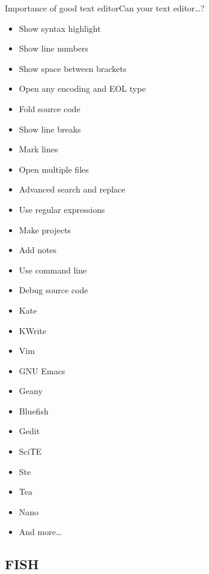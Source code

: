 \documentclass[hyperref={bookmarks=true, unicode=true, colorlinks=true, pdftitle={Linux, command line and MetaCentrum}, plainpages=false, pdfauthor={Vojtech Zeisek}, pdfsubject={Course about use of Linux command line, writing shell scripts and using MetaCentrum of CESNET}, pdfcreator={XeLaTeX, http://www.xelatex.org/}, pdfkeywords={Linux, GNU, BASH, shell, command line, MetaCentrum}, linkcolor=Sienna, anchorcolor=black, citecolor=green, filecolor=magenta, menucolor=Sienna, urlcolor=cyan, pdftex}, compress, ucs, xelatex, xcolor=svgnames, 11pt]{beamer}
\begin{document}
\begin{frame}[label=editors]{Importance of good text editor}{Can your text editor\ldots ?}
\begin{multicols}{2}
  \begin{itemize}
    \item Show syntax highlight
    \item Show line numbers
    \item Show space between brackets
    \item Open any encoding and EOL type
    \item Fold source code
    \item Show line breaks
    \item Mark lines
    \item Open multiple files
    \item Advanced search and replace
    \item Use regular expressions
    \item Make projects
    \item Add notes
    \item Use command line
    \item Debug source code
  \end{itemize}
\end{multicols}
\begin{multicols}{4}
  \begin{itemize}
    \item Kate
    \item KWrite
    \item Vim
    \item GNU Emacs
    \item Geany
    \item Bluefish
    \item Gedit
    \item SciTE
    \item Ste
    \item Tea
    \item Nano
    \item And more\ldots
  \end{itemize}
\end{multicols}
\end{frame}

\subsection{FISH}
\end{document}
